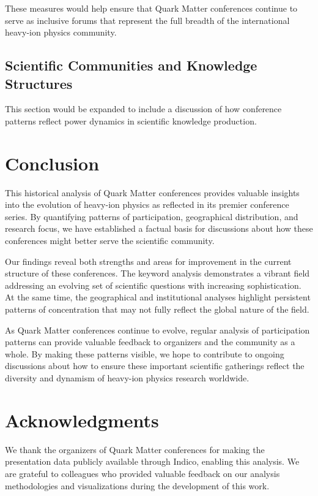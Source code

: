 \documentclass[a4paper,11pt]{article}
\begin{document}
These measures would help ensure that Quark Matter conferences continue to serve as inclusive forums that represent the full breadth of the international heavy-ion physics community.

\subsection{Scientific Communities and Knowledge Structures}

This section would be expanded to include a discussion of how conference patterns reflect power dynamics in scientific knowledge production.

\section{Conclusion}

This historical analysis of Quark Matter conferences provides valuable insights into the evolution of heavy-ion physics as reflected in its premier conference series. By quantifying patterns of participation, geographical distribution, and research focus, we have established a factual basis for discussions about how these conferences might better serve the scientific community.

Our findings reveal both strengths and areas for improvement in the current structure of these conferences. The keyword analysis demonstrates a vibrant field addressing an evolving set of scientific questions with increasing sophistication. At the same time, the geographical and institutional analyses highlight persistent patterns of concentration that may not fully reflect the global nature of the field.

As Quark Matter conferences continue to evolve, regular analysis of participation patterns can provide valuable feedback to organizers and the community as a whole. By making these patterns visible, we hope to contribute to ongoing discussions about how to ensure these important scientific gatherings reflect the diversity and dynamism of heavy-ion physics research worldwide.

\section{Acknowledgments}

We thank the organizers of Quark Matter conferences for making the presentation data publicly available through Indico, enabling this analysis. We are grateful to colleagues who provided valuable feedback on our analysis methodologies and visualizations during the development of this work.


\end{document}
